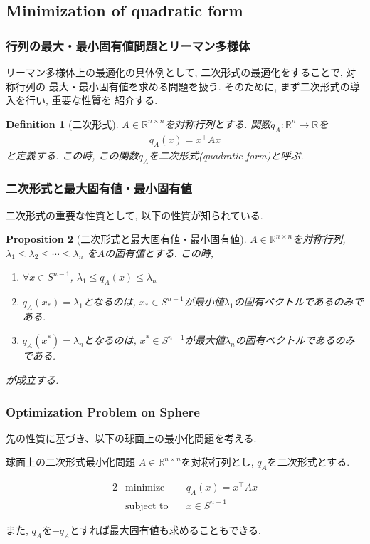 \documentclass[dvipdfmx,11pt]{beamer}		%
\makeatletter
\newtheorem{defi}{Definition}
\newtheorem{prop}[defi]{Proposition}
\newcommand{\R}{\mathbb{R}}
\newcounter{mpproblem}[section]
\newenvironment{mpproblem}[1]%
{%
    \protected@edef\@currentlabelname{#1}%
    \par\vspace{\baselineskip}\noindent%
    \ifx#1\empty %
    \else \refstepcounter{mpproblem}$($#1$)$ %
    \fi%
    \hfill%
    $\left|%
    \hfill%
    \hspace{0.00\textwidth}%
    \@fleqntrue\@mathmargin\parindent%
    \begin{minipage}{0.86\textwidth}%
    \vspace{-1.0\baselineskip}%
}%
{%
    \end{minipage}%
    \@fleqnfalse%
    \right.$%
    \par\vspace{\baselineskip}\noindent%
    \ignorespacesafterend%
}%
\newenvironment{mpproblem*}%
{%
    \begin{mpproblem}{}%
}%
{%
    \end{mpproblem}%
    \ignorespacesafterend%
}
\makeatother
\begin{document}
    \subsection{Minimization of quadratic form}
    \begin{frame}
        \frametitle{行列の最大・最小固有値問題とリーマン多様体}
        リーマン多様体上の最適化の具体例として, 二次形式の最適化をすることで, 対称行列の
        最大・最小固有値を求める問題を扱う. そのために, まず二次形式の導入を行い, 重要な性質を
        紹介する. 
        \begin{defi}[二次形式]
            $A\in\R^{n\times n}$を対称行列とする. 関数$q_{A}:\R^{n}\to\R$を
            \begin{align*}
                q_{A}(x) = x^{\top}Ax
            \end{align*}
            と定義する. この時, この関数$q_{A}$を二次形式(quadratic form)と呼ぶ. 
        \end{defi}
    \end{frame}
    \begin{frame}
        \frametitle{二次形式と最大固有値・最小固有値}
        二次形式の重要な性質として, 以下の性質が知られている.
        \begin{prop}[二次形式と最大固有値・最小固有値\cite{qform}]
            $A\in\R^{n\times n}$を対称行列, $\lambda_{1}\leq\lambda_{2}\leq\cdots\leq\lambda_{n}$
            を$A$の固有値とする. この時, 
            \begin{enumerate}
                \item $\forall x\in S^{n - 1}$, $\lambda_{1}\leq q_{A}(x)\leq\lambda_{n}$
                \item $q_{A}(x_*) = \lambda_1$となるのは, $x_*\in S^{n - 1}$が最小値$\lambda_1$の固有ベクトルであるのみである.
                \item $q_{A}(x^*) = \lambda_n$となるのは, $x^*\in S^{n - 1}$が最大値$\lambda_n$の固有ベクトルであるのみである.
            \end{enumerate}
            が成立する. 
        \end{prop}
    \end{frame}
    \begin{frame}
        \frametitle{Optimization Problem on Sphere}
        先の性質に基づき、以下の球面上の最小化問題を考える.
        \begin{exampleblock}{球面上の二次形式最小化問題}
            $A\in\R^{n\times n}$を対称行列とし, $q_{A}$を二次形式とする. 
            \begin{mpproblem*}
                \begin{alignat*}{2}
                 &\text{minimize}   & \quad q_{A}(x) = x^{\top}Ax  \\
                 &\text{subject to} & \quad x\in S^{n - 1}  
                \end{alignat*}
            \end{mpproblem*}
        \end{exampleblock}
        また, $q_{A}$を$-q_{A}$とすれば最大固有値も求めることもできる. 
    \end{frame}
\end{document}
